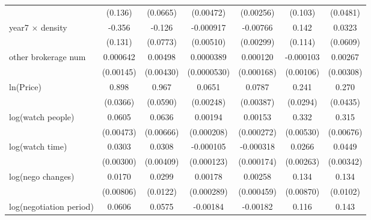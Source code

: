 {\begin{tabular}{l*{6}{c}}
            &     (0.136)         &    (0.0665)         &   (0.00472)         &   (0.00256)         &     (0.103)         &    (0.0481)         \\
\addlinespace
year7 $\times$ density&      -0.356\sym{***}&      -0.126         &   -0.000917         &    -0.00766\sym{**} &       0.142         &      0.0323         \\
            &     (0.131)         &    (0.0773)         &   (0.00510)         &   (0.00299)         &     (0.114)         &    (0.0609)         \\
\addlinespace
other brokerage num  &    0.000642         &     0.00498         &   0.0000389         &    0.000120         &   -0.000103         &     0.00267         \\
            &   (0.00145)         &   (0.00430)         & (0.0000530)         &  (0.000168)         &   (0.00106)         &   (0.00308)         \\
\addlinespace
ln(Price)&       0.898\sym{***}&       0.967\sym{***}&      0.0651\sym{***}&      0.0787\sym{***}&       0.241\sym{***}&       0.270\sym{***}\\
            &    (0.0366)         &    (0.0590)         &   (0.00248)         &   (0.00387)         &    (0.0294)         &    (0.0435)         \\
\addlinespace
log(watch people)&      0.0605\sym{***}&      0.0636\sym{***}&     0.00194\sym{***}&     0.00153\sym{***}&       0.332\sym{***}&       0.315\sym{***}\\
            &   (0.00473)         &   (0.00666)         &  (0.000208)         &  (0.000272)         &   (0.00530)         &   (0.00676)         \\
\addlinespace
log(watch time)&      0.0303\sym{***}&      0.0308\sym{***}&   -0.000105         &   -0.000318\sym{*}  &      0.0266\sym{***}&      0.0449\sym{***}\\
            &   (0.00300)         &   (0.00409)         &  (0.000123)         &  (0.000174)         &   (0.00263)         &   (0.00342)         \\
\addlinespace
log(nego changes)&      0.0170\sym{**} &      0.0299\sym{**} &     0.00178\sym{***}&     0.00258\sym{***}&       0.134\sym{***}&       0.134\sym{***}\\
            &   (0.00806)         &    (0.0122)         &  (0.000289)         &  (0.000459)         &   (0.00870)         &    (0.0102)         \\
\addlinespace
log(negotiation period)&      0.0606\sym{***}&      0.0575\sym{***}&    -0.00184\sym{***}&    -0.00182\sym{***}&       0.116\sym{***}&       0.143\sym{***}\\

\end{tabular}}
